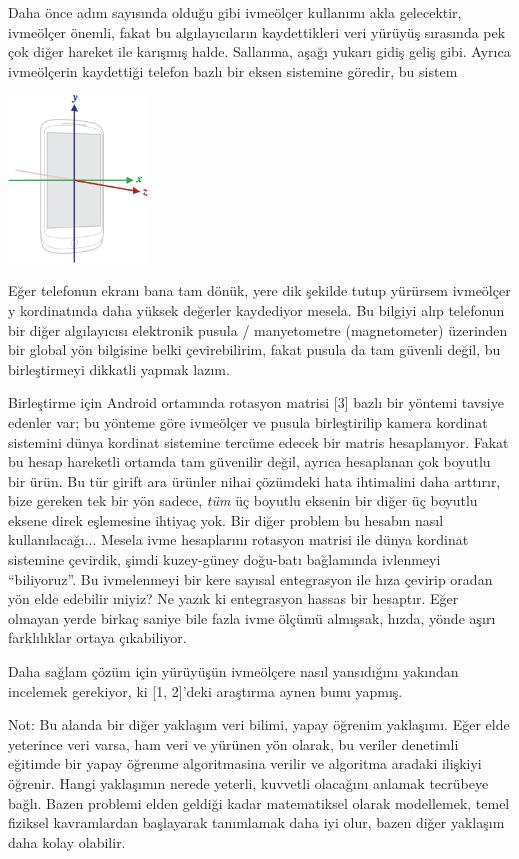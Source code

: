 \documentclass[12pt,fleqn]{article}\usepackage{../../common}
\begin{document}
Daha önce adım sayısında olduğu gibi ivmeölçer kullanımı akla gelecektir,
ivmeölçer önemli, fakat bu algılayıcıların kaydettikleri veri yürüyüş
sırasında pek çok diğer hareket ile karışmış halde. Sallanma, aşağı yukarı
gidiş geliş gibi. Ayrıca ivmeölçerin kaydettiği telefon bazlı bir eksen
sistemine göredir, bu sistem

\includegraphics[width=10em]{compscieng_app40walk_08.png}

Eğer telefonun ekranı bana tam dönük, yere dik şekilde tutup yürürsem
ivmeölçer y kordinatında daha yüksek değerler kaydediyor mesela. Bu bilgiyi
alıp telefonun bir diğer algılayıcısı elektronik pusula / manyetometre
(magnetometer) üzerinden bir global yön bilgisine belki çevirebilirim,
fakat pusula da tam güvenli değil, bu birleştirmeyi dikkatli yapmak
lazım. 

Birleştirme için Android ortamında rotasyon matrisi [3] bazlı bir yöntemi
tavsiye edenler var; bu yönteme göre ivmeölçer ve pusula birleştirilip
kamera kordinat sistemini dünya kordinat sistemine tercüme edecek bir
matris hesaplanıyor. Fakat bu hesap hareketli ortamda tam güvenilir değil,
ayrıca hesaplanan çok boyutlu bir ürün. Bu tür girift ara ürünler nihai
çözümdeki hata ihtimalini daha arttırır, bize gereken tek bir yön sadece,
{\em tüm} üç boyutlu eksenin bir diğer üç boyutlu eksene direk eşlemesine
ihtiyaç yok. Bir diğer problem bu hesabın nasıl kullanılacağı... Mesela
ivme hesaplarını rotasyon matrisi ile dünya kordinat sistemine çevirdik,
şimdi kuzey-güney doğu-batı bağlamında ivlenmeyi ``biliyoruz''. Bu
ivmelenmeyi bir kere sayısal entegrasyon ile hıza çevirip oradan yön elde
edebilir miyiz?  Ne yazık ki entegrasyon hassas bir hesaptır. Eğer olmayan
yerde birkaç saniye bile fazla ivme ölçümü almışsak, hızda, yönde aşırı
farklılıklar ortaya çıkabiliyor.

Daha sağlam çözüm için yürüyüşün ivmeölçere nasıl yansıdığını yakından
incelemek gerekiyor, ki [1, 2]'deki araştırma aynen bunu yapmış. 

Not: Bu alanda bir diğer yaklaşım veri bilimi, yapay öğrenim
yaklaşımı. Eğer elde yeterince veri varsa, ham veri ve yürünen yön olarak,
bu veriler denetimli eğitimde bir yapay öğrenme algoritmasina verilir ve
algoritma aradaki ilişkiyi öğrenir. Hangi yaklaşımın nerede yeterli,
kuvvetli olacağını anlamak tecrübeye bağlı. Bazen problemi elden geldiği
kadar matematiksel olarak modellemek, temel fiziksel kavramlardan
başlayarak tanımlamak daha iyi olur, bazen diğer yaklaşım daha kolay
olabilir.
\end{document}
